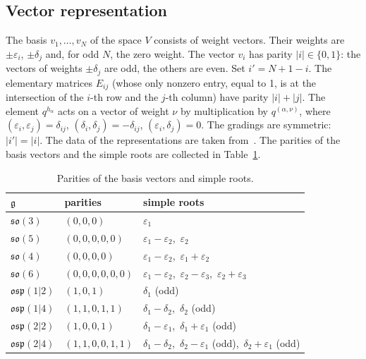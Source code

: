 \documentclass[12pt,a4paper]{article}
\newcommand{\g}{\mathfrak{g}}
\newcommand{\so}{\mathfrak{so}}
\newcommand{\osp}{\mathfrak{osp}}
\begin{document}
\subsection{Vector representation}\label{ss:rep}
The basis $v_1,\dots,v_N$ of the space $V$ consists of weight vectors. Their weights are $\pm\varepsilon_i$, $\pm\delta_j$ and, for odd $N$, the zero weight. The vector $v_i$ has parity $|i|\in\{0,1\}$: the vectors of weights $\pm\delta_j$ are odd, the others are even.
Set $i'=N+1-i$. The elementary matrices $E_{ij}$ (whose only nonzero entry, equal to 1, is at the intersection of the $i$-th row and the $j$-th column) have parity $|i|+|j|$. The element $q^{h_\alpha}$ acts on a vector of weight $\nu$
by multiplication by $q^{(\alpha,\nu)}$, where $(\varepsilon_i,\varepsilon_j)=\delta_{ij}$, $(\delta_i,\delta_j)=-\delta_{ij}$, $(\varepsilon_i,\delta_j)=0$.
The gradings are symmetric: $|i'|=|i|$. The data of the representations are taken from~\cite[Sections~2.2, 2.3]{AMS}. The parities of the basis vectors and the simple roots are collected in
Table~\ref{t:data}.

\begin{table}[H]
\centering\small
\begin{tabular}{@{}lll@{}}
\toprule
$\g$ & parities & simple roots\\
\midrule
$\so(3)$ & $(0,0,0)$ & $\varepsilon_1$\\
$\so(5)$ & $(0,0,0,0,0)$ & $\varepsilon_1-\varepsilon_2$,\ $\varepsilon_2$\\
$\so(4)$ & $(0,0,0,0)$ & $\varepsilon_1-\varepsilon_2$,\ $\varepsilon_1+\varepsilon_2$\\
$\so(6)$ & $(0,0,0,0,0,0)$ & $\varepsilon_1-\varepsilon_2$,\ $\varepsilon_2-\varepsilon_3$,\ $\varepsilon_2+\varepsilon_3$\\
$\osp(1|2)$ & $(1,0,1)$ & $\delta_1$ (odd)\\
$\osp(1|4)$ & $(1,1,0,1,1)$ & $\delta_1-\delta_2$,\ $\delta_2$ (odd)\\
$\osp(2|2)$ & $(1,0,0,1)$ & $\delta_1-\varepsilon_1$,\ $\delta_1+\varepsilon_1$ (odd)\\
$\osp(2|4)$ & $(1,1,0,0,1,1)$ & $\delta_1-\delta_2$,\ $\delta_2-\varepsilon_1$ (odd),\ $\delta_2+\varepsilon_1$ (odd)\\
\bottomrule
\end{tabular}
\caption{Parities of the basis vectors and simple roots.}\label{t:data}
\end{table}
\end{document}
